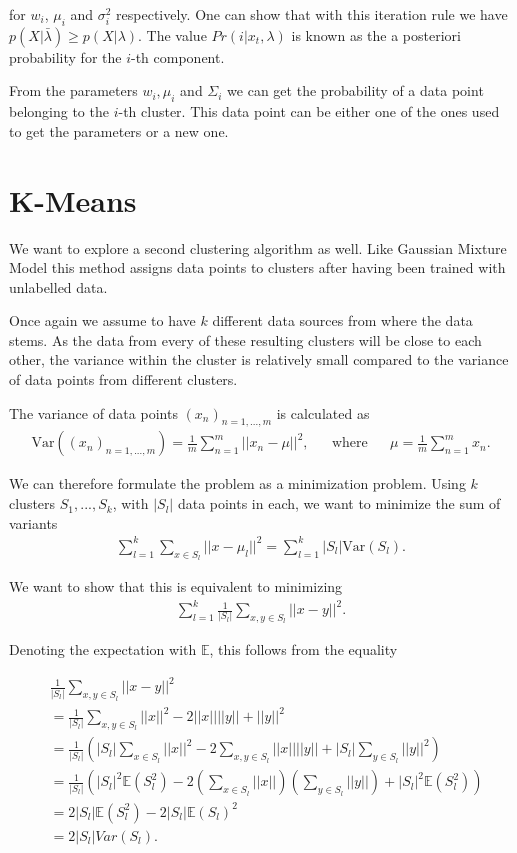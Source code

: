 for $w_i$, $\mu_i$ and $\sigma_i^2$ respectively. One can show that with this iteration rule we have $p(X|\bar{\lambda}) \geq p(X|\lambda)$. The value $Pr(i|x_t, \lambda)$ is known as the a posteriori probability for the $i$-th component.

From the parameters $w_i, \mu_i$ and $\Sigma_i$ we can get the probability of a data point belonging to the $i$-th cluster. This data point can be either one of the ones used to get the parameters or a new one.

\section{K-Means}

We want to explore a second clustering algorithm as well. Like Gaussian Mixture Model this method assigns data points to clusters after having been trained with unlabelled data.

Once again we assume to have $k$ different data sources from where the data stems. As the data from every of these resulting clusters will be close to each other, the variance within the cluster is relatively small compared to the variance of data points from different clusters.

The variance of data points $(x_n)_{n=1, ..., m}$ is calculated as
\begin{align*}
	\text{Var}((x_n)_{n=1, ..., m}) = \frac{1}{m} \sum_{n=1}^{m} ||x_n - \mu||^2, && \text{where} && \mu = \frac{1}{m} \sum_{n=1}^{m} x_n.
\end{align*}

We can therefore formulate the problem as a minimization problem. Using $k$ clusters $S_1, ..., S_k$, with $|S_l|$ data points in each, we want to minimize the sum of variants
\begin{align*}
	\sum_{l=1}^{k} \sum_{x \in S_l} ||x - \mu_l||^2 = \sum_{l=1}^{k} |S_l| \text{Var}(S_l).
\end{align*}

We want to show that this is equivalent to minimizing
\begin{align*}
	\sum_{l=1}^{k} \frac{1}{|S_l|} \sum_{x, y \in S_l} ||x-y||^2.
\end{align*}

Denoting the expectation with $\mathds{E}$, this follows from the equality

\begin{align*}
	&\frac{1}{|S_l|} \sum_{x, y \in S_l} ||x-y||^2\\
	&= \frac{1}{|S_l|} \sum_{x, y \in S_l} ||x||^2 - 2||x|| ||y|| + ||y||^2\\
	&= \frac{1}{|S_l|} \left(|S_l| \sum_{x\in S_l} ||x||^2 - 2\sum_{x, y \in S_l}||x|| ||y|| + |S_l| \sum_{y \in S_l}||y||^2\right)\\
	&= \frac{1}{|S_l|} (|S_l|^2 \mathds{E}(S_l^2) - 2\left(\sum_{x\in S_l}||x||\right)\left(\sum_{y \in S_l}||y||\right) + |S_l|^2 \mathds{E}(S_l^2))\\
	&= 2|S_l| \mathds{E}(S_l^2) - 2|S_l| \mathds{E}(S_l)^2\\
	&= 2 |S_l| Var(S_l).
\end{align*}


